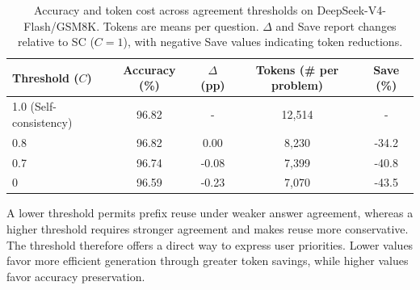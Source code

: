 \begin{table}[htbp]
\centering
\caption{Accuracy and token cost across agreement thresholds on DeepSeek-V4-Flash/GSM8K. Tokens are means per question. $\Delta$ and Save report changes relative to SC ($C=1$), with negative Save values indicating token reductions.}
\label{tab:threshold}
\begin{tabular}{lcccc}
\toprule
Threshold ($C$) & Accuracy (\%) & $\Delta$ (pp) & Tokens (\# per problem) & Save (\%)\\
\midrule
1.0 (Self-consistency) & 96.82 & - & 12,514 & - \\
0.8  & 96.82 & 0.00 & 8,230 & -34.2\\
0.7  & 96.74 & -0.08 & 7,399 & -40.8\\
0  & 96.59 & -0.23  & 7,070 & -43.5\\
\bottomrule
\end{tabular}
\end{table}

A lower threshold permits prefix reuse under weaker answer agreement, whereas a higher threshold requires stronger agreement and makes reuse more conservative. The threshold therefore offers a direct way to express user priorities. Lower values favor more efficient generation through greater token savings, while higher values favor accuracy preservation.

